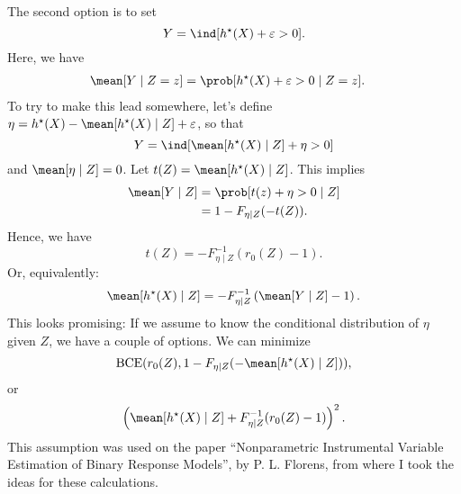 The second option is to set
\begin{equation}
    \label{Y is indicator}
    Y = \ind [ \hstar ( X ) + \varepsilon > 0 ]
.\end{equation}
Here, we have
\begin{align}
    \mean [ Y \mid Z = z ]
    &= \prob [ \hstar ( X ) + \varepsilon > 0 \mid Z = z ]
.\end{align}
To try to make this lead somewhere, let's define $ \eta = \hstar ( X ) - \mean [ \hstar ( X ) \mid Z ] + \varepsilon $, so that
\begin{equation*}
    Y = \ind [ \mean [ \hstar ( X ) \mid Z ] + \eta > 0]
\end{equation*}
and $ \mean [ \eta \mid Z ] = 0 $.
Let $ t ( Z ) = \mean [ \hstar ( X ) \mid Z ] $.
This implies
\begin{align*}
    \mean [ Y \mid Z ]
    &= \prob [ t ( z ) + \eta > 0 \mid Z ] \\
    &= 1 - F_{ \eta \mid Z } ( - t ( Z ) )
.\end{align*}
Hence, we have
\begin{equation*}
    t ( Z ) = - F_{ \eta \mid Z }^{ -1 } ( r_{ 0 } ( Z ) - 1 )
.\end{equation*}
Or, equivalently:
\begin{equation*}
    \mean [ \hstar ( X ) \mid Z ] = - F^{ -1 }_{ \eta \mid Z } \left( \mean [ Y \mid Z ] - 1 \right)
.\end{equation*}
This looks promising:
If we assume to know the conditional distribution of $ \eta $ given $ Z $, we have a couple of options.
We can minimize
\begin{equation*}
    \BCE ( r_{ 0 } ( Z ) , 1 - F_{ \eta \mid Z } ( - \mean [ \hstar ( X ) \mid Z ] ) )
,\end{equation*}
or
\begin{equation*}
     \left( \mean [ \hstar ( X ) \mid Z ] + F_{ \eta \mid Z }^{ -1 } ( r_{ 0 } ( Z ) - 1 ) \right)^2
.\end{equation*}
This assumption was used on the paper ``Nonparametric Instrumental Variable Estimation of Binary Response Models'', by P. L. Florens, from where I took the ideas for these calculations.
